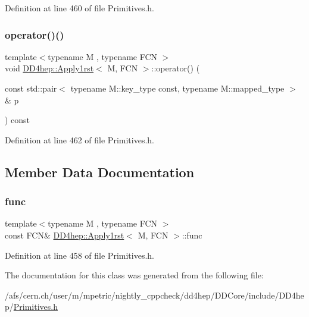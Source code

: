 Definition at line 460 of file Primitives.\+h.

\hypertarget{class_d_d4hep_1_1_apply1rst_a539dad6fe12c3e66ab194e30f49c356b}{}\label{class_d_d4hep_1_1_apply1rst_a539dad6fe12c3e66ab194e30f49c356b} 
\subsubsection{\texorpdfstring{operator()()}{operator()()}\hspace{0.1cm}{\footnotesize\ttfamily [2/2]}}
{\footnotesize\ttfamily template$<$typename M , typename F\+CN $>$ \\
void \hyperlink{class_d_d4hep_1_1_apply1rst}{D\+D4hep\+::\+Apply1rst}$<$ M, F\+CN $>$\+::operator() (\begin{DoxyParamCaption}\item[{const std\+::pair$<$ typename M\+::key\+\_\+type const, typename M\+::mapped\+\_\+type $>$ \&}]{p }\end{DoxyParamCaption}) const\hspace{0.3cm}{\ttfamily [inline]}}



Definition at line 462 of file Primitives.\+h.



\subsection{Member Data Documentation}
\hypertarget{class_d_d4hep_1_1_apply1rst_a3e6269941aac554118d47927dcdeba97}{}\label{class_d_d4hep_1_1_apply1rst_a3e6269941aac554118d47927dcdeba97} 
\subsubsection{\texorpdfstring{func}{func}}
{\footnotesize\ttfamily template$<$typename M , typename F\+CN $>$ \\
const F\+CN\& \hyperlink{class_d_d4hep_1_1_apply1rst}{D\+D4hep\+::\+Apply1rst}$<$ M, F\+CN $>$\+::func}



Definition at line 458 of file Primitives.\+h.



The documentation for this class was generated from the following file\+:\begin{DoxyCompactItemize}
\item 
/afs/cern.\+ch/user/m/mpetric/nightly\+\_\+cppcheck/dd4hep/\+D\+D\+Core/include/\+D\+D4hep/\hyperlink{_primitives_8h}{Primitives.\+h}\end{DoxyCompactItemize}
